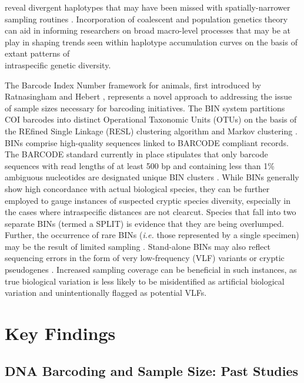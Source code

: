 reveal divergent haplotypes that may have been missed with spatially-narrower sampling routines \cite{monaghan2009accelerated}. Incorporation of coalescent and population genetics theory can aid in informing researchers on broad macro-level processes that may be at play in shaping trends seen within haplotype accumulation curves on the basis of extant patterns of \\ intraspecific genetic diversity. 


 
The Barcode Index Number framework for animals, first introduced by Ratnasingham and Hebert \cite{ratnasingham2013dna}, represents a novel approach to addressing the issue of sample sizes necessary for barcoding initiatives. The BIN system partitions COI barcodes into distinct Operational Taxonomic Units (OTUs) on the basis of the REfined Single Linkage (RESL) clustering algorithm and Markov clustering \cite{ratnasingham2013dna}. BINs comprise high-quality sequences linked to BARCODE compliant records. The BARCODE standard currently in place stipulates that only barcode sequences with read lengths of at least 500 bp and containing less than 1\% ambiguous nucleotides are designated unique BIN clusters \cite{hanner2009data}. While BINs generally show high concordance with actual biological species, they can be further 
\\ employed to gauge instances of suspected cryptic species diversity, especially in the cases where intraspecific distances are not clearcut.  Species that fall into two separate BINs (termed a SPLIT) is evidence that they are being overlumped. Further, the occurrence of rare BINs (\textit{i.e.} those represented by a single specimen) may be the result of limited sampling \cite{hausmann2013genetic, huemer2014testing}. Stand-alone BINs may also reflect sequencing errors in the form of very low-frequency (VLF) variants or cryptic pseudogenes \cite{stoeckle2012frequency, stoeckle2014dna}. Increased sampling coverage can be beneficial in such instances, as true biological variation is less likely to be misidentified as artificial biological variation and unintentionally flagged as potential VLFs.






\section{Key Findings}

\subsection{DNA Barcoding and Sample Size: Past Studies}

